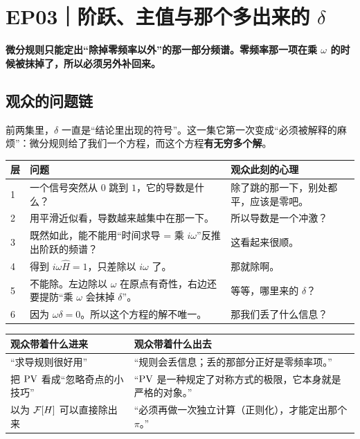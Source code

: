 \chapter{EP03｜阶跃、主值与那个多出来的 $\delta$}

\begin{ideabox}[这一集的一句话]
\textbf{微分规则只能定出“除掉零频率以外”的那一部分频谱。零频率那一项在乘 $\omega$ 的时候被抹掉了，所以必须另外补回来。}
\end{ideabox}

\section{观众的问题链}

前两集里，$\delta$ 一直是“结论里出现的符号”。这一集它第一次变成“必须被解释的麻烦”：微分规则给了我们一个方程，而这个方程\textbf{有无穷多个解}。

\begin{center}
\small
\renewcommand{\arraystretch}{1.32}
\begin{tabularx}{\textwidth}{@{}p{0.8cm}X p{4.4cm}@{}}
\toprule
层 & 问题 & 观众此刻的心理 \\
\midrule
1 & 一个信号突然从 $0$ 跳到 $1$，它的导数是什么？ & 除了跳的那一下，别处都平，应该是零吧。\\
2 & 用平滑近似看，导数越来越集中在那一下。 & 所以导数是一个冲激？\\
3 & 既然如此，能不能用“时间求导 = 乘 $i\omega$”反推出阶跃的频谱？ & 这看起来很顺。\\
4 & 得到 $i\omega\widehat H=1$，只差除以 $i\omega$ 了。 & 那就除啊。\\
5 & 不能除。左边除以 $\omega$ 在原点有奇性，右边还要提防“乘 $\omega$ 会抹掉 $\delta$”。 & 等等，哪里来的 $\delta$？\\
6 & 因为 $\omega\delta=0$。所以这个方程的解不唯一。 & 那我们丢了什么信息？\\
\bottomrule
\end{tabularx}
\end{center}

\begin{center}
\small
\renewcommand{\arraystretch}{1.32}
\begin{tabularx}{\textwidth}{@{}p{3.2cm}Y@{}}
\toprule
观众带着什么进来 & 观众带着什么出去 \\
\midrule
“求导规则很好用” & “规则会丢信息；丢的那部分正好是零频率项。”\\
把 $\operatorname{PV}$ 看成“忽略奇点的小技巧” & “$\operatorname{PV}$ 是一种规定了对称方式的极限，它本身就是严格的对象。”\\
以为 $\mathcal{F}[H]$ 可以直接除出来 & “必须再做一次独立计算（正则化），才能定出那个 $\pi$。”\\
\bottomrule
\end{tabularx}
\end{center}

